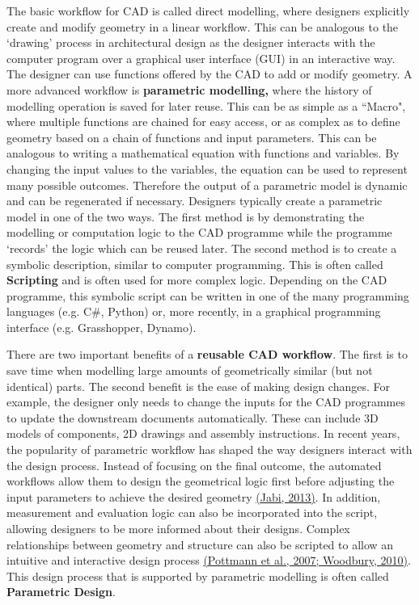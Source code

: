\documentclass[11pt]{book}
\begin{document}
The basic workflow for CAD is called direct modelling, where designers explicitly create and modify geometry in a linear workflow. This can be analogous to the ‘drawing’ process in architectural design as the designer interacts with the computer program over a graphical user interface (GUI) in an interactive way. The designer can use functions offered by the CAD to add or modify geometry. A more advanced workflow is \textbf{parametric modelling,} where the history of modelling operation is saved for later reuse. This can be as simple as a ``Macro", where multiple functions are chained for easy access, or as complex as to define geometry based on a chain of functions and input parameters. This can be analogous to writing a mathematical equation with functions and variables. By changing the input values to the variables, the equation can be used to represent many possible outcomes. Therefore the output of a parametric model is dynamic and can be regenerated if necessary. Designers typically create a parametric model in one of the two ways. The first method is by demonstrating the modelling or computation logic to the CAD programme while the programme ‘records’ the logic which can be reused later. The second method is to create a symbolic description, similar to computer programming. This is often called \textbf{Scripting} and is often used for more complex logic. Depending on the CAD programme, this symbolic script can be written in one of the many programming languages (e.g. C$\#$, Python) or, more recently, in a graphical programming interface (e.g. Grasshopper, Dynamo). 

There are two important benefits of a \textbf{reusable CAD workflow}. The first is to save time when modelling large amounts of geometrically similar (but not identical) parts. The second benefit is the ease of making design changes. For example, the designer only needs to change the inputs for the CAD programmes to update the downstream documents automatically. These can include 3D models of components, 2D drawings and assembly instructions. In recent years, the popularity of parametric workflow has shaped the way designers interact with the design process. Instead of focusing on the final outcome, the automated workflows allow them to design the geometrical logic first before adjusting the input parameters to achieve the desired geometry \href{https://www.zotero.org/google-docs/?FS9SSk}{(Jabi, 2013)}. In addition, measurement and evaluation logic can also be incorporated into the script, allowing designers to be more informed about their designs. Complex relationships between geometry and structure can also be scripted to allow an intuitive and interactive design process \href{https://www.zotero.org/google-docs/?Dtpbzu}{(Pottmann et al., 2007; Woodbury, 2010)}. This design process that is supported by parametric modelling is often called \textbf{Parametric Design}.
\end{document}
